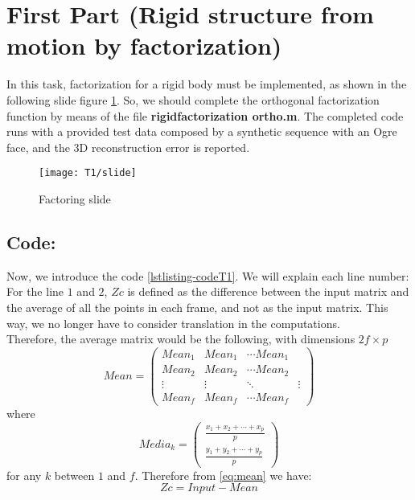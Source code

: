 \section{First Part (Rigid structure from motion by factorization)}
\noindent In this task, factorization for a rigid body must be implemented, as shown in the following slide figure \ref{fig:slideT1}.
\noindent So, we should complete the orthogonal factorization function by means of the file \textbf{rigidfactorization ortho.m}. The completed code runs with a provided test data composed by a synthetic sequence with an Ogre face, and the 3D reconstruction error is reported.\\

\begin{figure}[h]
    \centering
    \texttt{[image: T1/slide]}
    \caption{Factoring slide}
    \label{fig:slideT1}
\end{figure}

\subsection{Code:}
\noindent Now, we introduce the code \ref{lstlisting-codeT1}. We will explain each line number:\\ 
\noindent For the line $1$ and $2$, $Zc$ is defined as the difference between the input matrix and the average of all the points in each frame, and not as the input matrix.
This way, we no longer have to consider translation in the computations.\\ 
\noindent Therefore, the average matrix would be the following, with dimensions $2f\times p$
\begin{equation}\label{eq:mean}
Mean=
\begin{pmatrix}
Mean_{1} & Mean_{1} & \cdots Mean_{1}\\
Mean_{2} & Mean_{2} & \cdots Mean_{2}\\
\vdots & \vdots & \ddots & \vdots\\
Mean_{f} & Mean_{f} & \cdots Mean_{f}
\end{pmatrix}
\end{equation}
\noindent where
\begin{equation}
Media_{k}=
\begin{pmatrix}
\frac{x_{1} + x_{2} + \cdots + x_{p}}{p}\\
\frac{y_{1} + y_{2} + \cdots + y_{p}}{p}
\end{pmatrix}
\end{equation}
\noindent for any $k$ between $1$ and $f$.
\noindent Therefore from \ref{eq:mean} we have:
\begin{equation}
Zc=Input-Mean
\end{equation}

